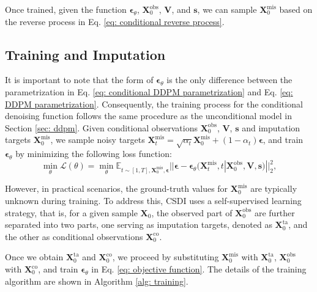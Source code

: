 \documentclass[11pt]{article}
\begin{document}
Once trained, given the function $\bm{\epsilon}_{\theta}$, $\bm{X}_0^{\mathrm{obs}}$, $\bm{V}$, and $\bm{s}$, we can sample $\bm{X}_0^{\mathrm{mis}}$ based on the reverse process in Eq. \ref{eq: conditional reverse process}. 

\subsection{Training and Imputation}\label{sec: training of csdi}
It is important to note that the form of $\bm{\epsilon}_{\theta}$ is the only difference between the parametrization in Eq. \ref{eq: conditional DDPM parametrization} and Eq. \ref{eq: DDPM parametrization}. Consequently, the training process for the conditional denoising function follows the same procedure as the unconditional model in Section \ref{sec: ddpm}. Given conditional observations $\bm{X}_0^{\mathrm{obs}}$, $\bm{V}$, $\bm{s}$ and imputation targets $\bm{X}_0^{\mathrm{mis}}$, we sample noisy targets $\bm{X}_t^{\mathrm{mis}}=\sqrt{\alpha_t}\bm{X}_0^{\mathrm{mis}}+(1-\alpha_t)\bm{\epsilon}$, and train $\bm{\epsilon}_{\theta}$ by minimizing the following loss function:
\begin{equation}\label{eq: objective function}
	\min_{\theta}\mathcal{L}(\theta)=\min_{\theta}\mathbb{E}_{t\sim [1,T],\bm{X}_0^{\mathrm{mis}},\bm{\epsilon}}||\bm{\epsilon}-\bm{\epsilon}_{\theta}(\bm{X}_t^{\mathrm{mis}}, t|\bm{X}_0^{\mathrm{obs}},\bm{V},\bm{s})||^2_2,
\end{equation}


However, in practical scenarios, the ground-truth values for $\bm{X}_0^{\mathrm{mis}}$ are typically unknown during training. To address this, CSDI uses a self-supervised learning strategy, that is, for a given sample $\bm{X}_0$, the observed part of $\bm{X}_0^{\mathrm{obs}}$ are further separated into two parts, one serving as imputation targets, denoted as $\bm{X}_0^{\mathrm{ta}}$, and the other as conditional observations $\bm{X}_0^{\mathrm{co}}$. 


Once we obtain $\bm{X}_0^{\mathrm{ta}}$ and $\bm{X}_0^{\mathrm{co}}$, we proceed by substituting $\bm{X}_0^{\mathrm{mis}}$ with $\bm{X}_0^{\mathrm{ta}}$, $\bm{X}_0^{\mathrm{obs}}$ with $\bm{X}_0^{\mathrm{co}}$,  and train $\bm{\epsilon}_{\theta}$ in Eq. \ref{eq: objective function}. The details of the training algorithm are shown in Algorithm \ref{alg: training}.
\end{document}
